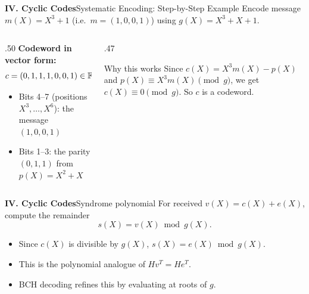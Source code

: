 \begin{frame}{\textbf{IV. Cyclic Codes}}{Systematic Encoding: Step-by-Step Example}
\small
Encode message $m(X) = X^3 + 1$ (i.e.\ $m=(1,0,0,1)$) using $g(X)=X^3+X+1$.

\medskip
\begin{center}
\end{center}

\vspace{-2pt}
\begin{columns}[T,onlytextwidth]
  \begin{column}{.50\textwidth}
    \textbf{Codeword in vector form:}
    \[
      c = (0,1,1,1,0,0,1) \in \mathbb{F}_2^7
    \]
    \begin{itemize}
      \item Bits 4--7 (positions $X^3,\ldots,X^6$): the message $(1,0,0,1)$
      \item Bits 1--3: the parity $(0,1,1)$ from $p(X)=X^2+X$
    \end{itemize}
  \end{column}
  \begin{column}{.47\textwidth}
    \begin{block}{Why this works}
    Since $c(X) = X^3 m(X) - p(X)$ and $p(X) \equiv X^3 m(X) \pmod{g}$, we get $c(X) \equiv 0 \pmod{g}$. So $c$ is a codeword.
    \end{block}
  \end{column}
\end{columns}
\end{frame}

\begin{frame}{\textbf{IV. Cyclic Codes}}{Syndrome polynomial}
\small
For received $v(X)=c(X)+e(X)$, compute the remainder
\[
  s(X)=v(X)\bmod g(X).
\]
\begin{itemize}
  \item Since $c(X)$ is divisible by $g(X)$, $s(X)=e(X)\bmod g(X)$.
  \item This is the polynomial analogue of $Hv^T=He^T$.
  \item BCH decoding refines this by evaluating at roots of $g$.
\end{itemize}
\end{frame}

